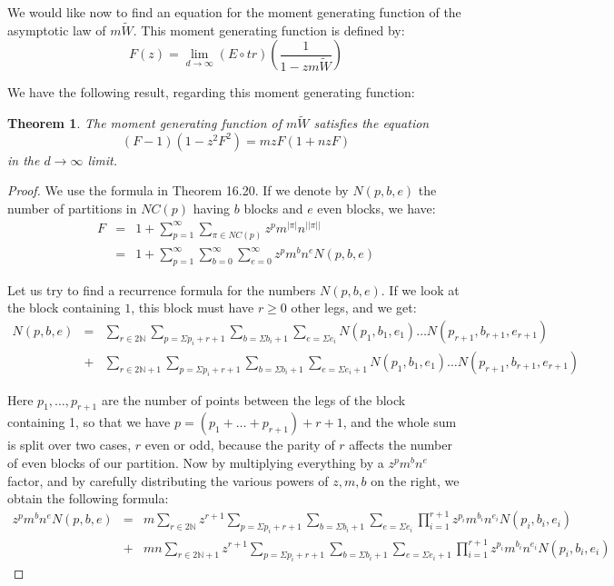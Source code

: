 \documentclass[12pt]{amsbook}
\newtheorem{theorem}{Theorem}[chapter]
\begin{document}
We would like now to find an equation for the moment generating function of the asymptotic law of $m\widetilde{W}$. This moment generating function is defined by:
$$F(z)=\lim_{d\to\infty}(E\circ tr)\left(\frac{1}{1-zm\widetilde{W}}\right)$$

We have the following result, regarding this moment generating function:

\begin{theorem}
The moment generating function of $m\widetilde{W}$ satisfies the equation
$$(F-1)(1-z^2F^2)=mzF(1+nzF)$$
in the $d\to\infty$ limit.
\end{theorem}

\begin{proof}
We use the formula in Theorem 16.20. If we denote by $N(p,b,e)$ the number of partitions in $NC(p)$ having $b$ blocks and $e$ even blocks, we have:
\begin{eqnarray*}
F
&=&1+\sum_{p=1}^\infty\sum_{\pi\in NC(p)} z^pm^{|\pi|}n^{||\pi||}\\
&=&1+\sum_{p=1}^\infty\sum_{b=0}^\infty\sum_{e=0}^\infty z^pm^bn^eN(p,b,e)
\end{eqnarray*}

Let us try to find a recurrence formula for the numbers $N(p,b,e)$. If we look at the block containing $1$, this block must have $r\geq 0$ other legs, and we get:
\begin{eqnarray*}
N(p,b,e) 
&=&\sum_{r\in 2\mathbb N}\sum_{p=\Sigma p_i+r+1}\sum_{b=\Sigma b_i+1}\sum_{e=\Sigma e_i}N(p_1,b_1,e_1)\ldots N(p_{r+1},b_{r+1},e_{r+1})\\
&+&\sum_{r\in 2\mathbb N+1}\sum_{p=\Sigma p_i+r+1}\sum_{b=\Sigma b_i+1}\sum_{e=\Sigma e_i+1}N(p_1,b_1,e_1)\ldots N(p_{r+1},b_{r+1},e_{r+1})
\end{eqnarray*}

Here $p_1,\ldots,p_{r+1}$ are the number of points between the legs of the block containing 1, so that we have $p=(p_1+\ldots+p_{r+1})+r+1$, and the whole sum is split over two cases, $r$ even or odd, because the parity of $r$ affects the number of even blocks of our partition. Now by multiplying everything by a $z^pm^bn^e$ factor, and by carefully distributing the various powers of $z,m,b$ on the right, we obtain the following formula:
\begin{eqnarray*}
z^pm^bn^eN(p,b,e)
&=&m\sum_{r\in 2\mathbb N}z^{r+1}\sum_{p=\Sigma p_i+r+1}\sum_{b=\Sigma b_i+1}\sum_{e=\Sigma e_i}\prod_{i=1}^{r+1}z^{p_i}m^{b_i}n^{e_i}N(p_i,b_i,e_i)\\
&+&mn\sum_{r\in 2\mathbb N+1}z^{r+1}\sum_{p=\Sigma p_i+r+1}\sum_{b=\Sigma b_i+1}\sum_{e=\Sigma e_i+1}\prod_{i=1}^{r+1}z^{p_i}m^{b_i}n^{e_i}N(p_i,b_i,e_i)
\end{eqnarray*}


\end{proof}
\end{document}
